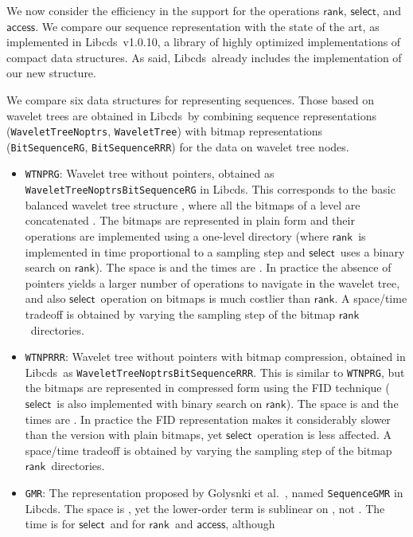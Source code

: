 \documentclass[11pt]{article}
\newcommand{\access}
    {\ensuremath{\mathsf{access}}}
\newcommand{\rank}
    {\ensuremath{\mathsf{rank}}}
\newcommand{\select}
    {\ensuremath{\mathsf{select}}}
\newcommand{\libcds}{{\sc Libcds}}
\begin{document}
\begin{table}[t]
{\begin{tabular}
We now consider the efficiency in the support for the operations \rank,
\select, and \access. We compare our sequence representation with the
state of the art, as implemented in \libcds\ v1.0.10, a library of
highly optimized implementations of compact data structures. As said,
\libcds\ already includes the implementation of our new structure.

We compare six data structures for representing sequences. Those based on 
wavelet trees are obtained in \libcds\ by combining sequence representations 
(\verb|WaveletTreeNoptrs|, \verb|WaveletTree|) with bitmap representations
(\verb|BitSequenceRG|, \verb|BitSequenceRRR|) for the data on wavelet tree 
nodes.  

\begin{itemize}
\item \verb|WTNPRG|: Wavelet tree without pointers, obtained as
  \verb|WaveletTreeNoptrs|\verb|BitSequenceRG| in \libcds. 
  This corresponds to the 
  basic balanced wavelet tree structure \cite{GGV03}, where all the bitmaps 
  of a level are concatenated \cite{MN07}. The bitmaps are represented in 
  plain form and their operations are implemented using a one-level directory 
  \cite{GGMN05} (where \rank\ is implemented in time proportional to a
  sampling step and \select\ uses a binary search on \rank). The space is
   and the times are . In
  practice the absence of pointers yields a larger number of operations to
  navigate in the wavelet tree, and also \select\ operation on bitmaps is
  much costlier than \rank. A space/time tradeoff is obtained by varying
  the sampling step of the bitmap \rank\ directories.
\item \verb|WTNPRRR|: Wavelet tree without pointers with bitmap compression, 
  obtained in \libcds\ as \verb|WaveletTreeNoptrs|\verb|BitSequenceRRR|. 
  This is similar to \verb|WTNPRG|, but the bitmaps are represented in
  compressed form using the FID technique \cite{RRR02} (\select\ is also
  implemented with binary search on \rank). The space is
   and the times are . In practice
  the FID representation makes it considerably slower than the version with
  plain bitmaps, yet \select\ operation is less affected.
  A space/time tradeoff is obtained by varying the sampling
  step of the bitmap \rank\ directories.
\item \verb|GMR|: The representation proposed by Golysnki et al.~\cite{GMR06}, 
  named \verb|SequenceGMR| in \libcds. The space is ,
  yet the lower-order term is sublinear on , not . The time is
   for \select\ and  for \rank\ and \access, although

\end{itemize}
\end{tabular}}
\end{table}
\end{document}
